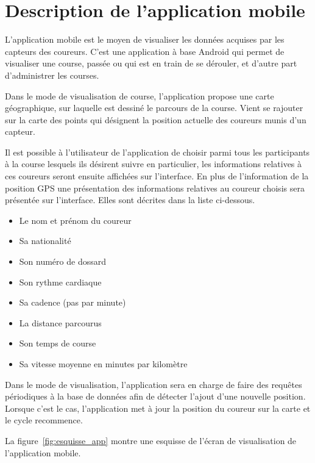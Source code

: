 
\chapter{Description de l'application mobile}

L’application mobile est le moyen de visualiser les données acquises par les capteurs des coureurs. C’est une application à base Android qui permet de visualiser une course, passée ou qui est en train de se dérouler, et d’autre part d’administrer les courses.

Dans le mode de visualisation de course, l’application propose une carte géographique, sur laquelle est dessiné le parcours de la course. Vient se rajouter sur la carte des points qui désignent la position actuelle des coureurs munis d’un capteur.

Il est possible à l’utilisateur de l’application de choisir parmi tous les participants à la course lesquels ils désirent suivre en particulier, les informations relatives à ces coureurs seront ensuite affichées sur l’interface. En plus de l’information de la position GPS une présentation des informations relatives au coureur choisis sera présentée sur l’interface. Elles sont décrites dans la liste ci-dessous.

\begin{itemize}
\item Le nom et prénom du coureur
\item Sa nationalité
\item Son numéro de dossard
\item Son rythme cardiaque
\item Sa cadence (pas par minute)
\item La distance parcourus
\item Son temps de course
\item Sa vitesse moyenne en minutes par kilomètre
\end{itemize}

Dans le mode de visualisation, l’application sera en charge de faire des requêtes périodiques à la base de données afin de détecter l’ajout d’une nouvelle position. Lorsque c’est le cas, l’application met à jour la position du coureur sur la carte et le cycle recommence.

La figure~\ref{fig:esquisse_app} montre une esquisse de l'écran de visualisation de l'application mobile. 

